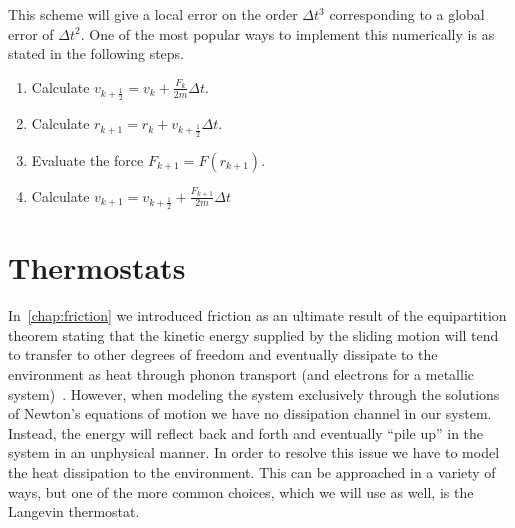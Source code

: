This scheme will give a local error on the order $\Delta t^3$ corresponding to a
global error of $\Delta t^2$. One of the most popular ways to implement this
numerically is as stated in the following steps.
\begin{enumerate}[leftmargin=6cm]
  \item Calculate $v_{k+\frac{1}{2}} = v_k + \frac{F_k}{2m} \Delta t$.
  \item Calculate $r_{k+1} = r_k + v_{k+\frac{1}{2}} \Delta t$.
  \item Evaluate the force $F_{k+1} = F(r_{k+1})$.
  \item Calculate $v_{k+1} = v_{k+\frac{1}{2}} + \frac{F_{k+1}}{2m} \Delta t$  
\end{enumerate}



\section{Thermostats}\label{sec:thermostat}
In~\cref{chap:friction} we introduced friction as an ultimate result of the equipartition theorem stating that the kinetic energy supplied by the sliding motion will tend to transfer to other degrees of freedom and eventually dissipate to the environment as heat through phonon transport (and electrons for a metallic system)~\cite{Manini_2016}. However, when modeling the system exclusively through the solutions of Newton's equations of motion we have no dissipation channel in our system. Instead, the energy will reflect back and forth and eventually ``pile up'' in the system in an unphysical manner. In order to resolve this issue we have to model the heat dissipation to the environment. This can be approached in a variety of ways, but one of the more common choices, which we will use as well, is the Langevin thermostat.







